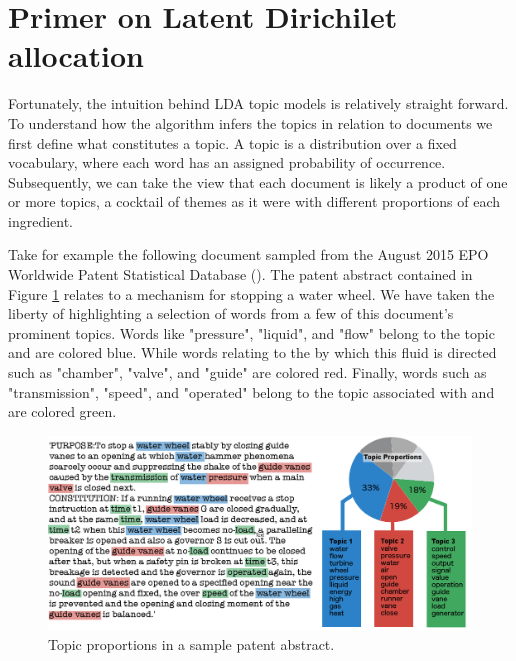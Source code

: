 


\section{Primer on Latent Dirichilet allocation} \label{ldaprimer}
Fortunately, the intuition behind LDA topic models is relatively straight forward. To understand how the algorithm infers the topics in relation to documents we first define what constitutes a topic. A topic is a distribution over a fixed vocabulary, where each word has an assigned probability of occurrence. Subsequently, we can take the view that each document is likely a product of one or more topics, a cocktail of themes as it were with different proportions of each ingredient.

Take for example the following document sampled from the August 2015 EPO Worldwide Patent Statistical Database (). The patent abstract contained in Figure \ref{fig:Patent_114} relates to a mechanism for stopping a water wheel. We have taken the liberty of highlighting a selection of words from a few of this document's prominent topics. Words like 
"pressure", "liquid", and "flow" belong to the  topic and are colored blue. While words relating to the  by which this fluid is directed such as "chamber", "valve", and "guide" are colored red. Finally, words such as "transmission", "speed", and "operated" belong to the topic associated with  and are colored green.

\begin{figure}[h]
\centering
\includegraphics[width=130mm,scale=0.45]{Figures/Patent114}
\decoRule
\caption[Patent114]{Topic proportions in a sample patent abstract.}
\label{fig:Patent_114}
\end{figure}


